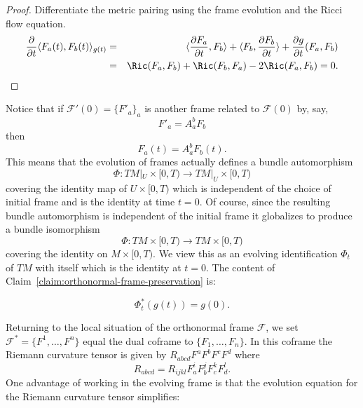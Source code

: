 \begin{proof}
\sketch Differentiate the metric pairing using the frame evolution and
the Ricci flow equation.
\begin{eqnarray*}
\frac{\partial}{\partial t}\langle F_a(t),F_b(t)\rangle_{g(t)} & = & \langle
\frac{\partial F_a}{\partial t},F_b\rangle + \langle F_b,\frac{\partial
F_b}{\partial t}\rangle +
\frac {\partial g}{\partial t}(F_a,F_b) \\
 & = & \Ric(F_a,F_b)+\Ric(F_b,F_a)-2\Ric(F_a,F_b)=0.
\end{eqnarray*}
\end{proof}

Notice that if ${\mathcal F}'(0)=\{F'_a\}_a$ is another
frame related to ${\mathcal F}(0)$ by, say,
$$F'_a=A^b_aF_b$$
then $$F_a(t)=A^b_aF_b(t).$$ This means that the evolution of frames
actually defines a bundle automorphism
$$\Phi\colon TM|_U\times [0,T)\to TM|_U\times [0,T)$$
covering the identity map of $U\times[0,T)$ which is independent of
the choice of initial frame and is the identity at time $t=0$. Of
course, since the resulting bundle automorphism is independent of
the initial frame it globalizes to produce a bundle isomorphism
$$\Phi\colon TM\times[0,T)\to TM\times [0,T)$$
covering the identity on $M\times [0,T)$. We view this as an
evolving identification $\Phi_t$ of $TM$ with itself which is the
identity at $t=0$. The content of Claim~\ref{claim:orthonormal-frame-preservation} is:

\begin{corollary}\label{cor:pullback-metric-constant}

$$\Phi_t^*(g(t))=g(0).$$
\end{corollary}

Returning to the local situation of the orthonormal frame ${\mathcal
F}$, we set ${\mathcal F}^*=\{F^1,\ldots, F^n\}$ equal the dual
coframe to $\{F_1,\ldots,F_n\}$. In this coframe the Riemann
curvature tensor is given by $R_{abcd}F^aF^bF^cF^d$ where
\begin{equation}\label{framecoord} R_{abcd} =
R_{ijkl}F^{i}_{a}F^{j}_{b}F^{k}_{c}F^{l}_{d}.\end{equation} One
advantage of working in the evolving frame is that the evolution
equation for the Riemann curvature tensor simplifies:


